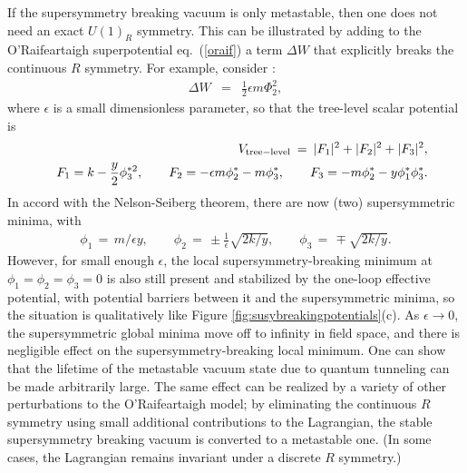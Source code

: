 \documentclass[11pt]{article}
\def\beq{\begin{eqnarray}}
\def\eeq{\end{eqnarray}}
\begin{document}
If the supersymmetry breaking vacuum is only metastable, then one does not need an exact $U(1)_R$ 
symmetry. This can be illustrated by adding to the O'Rai\-f\-ear\-taigh superpotential 
eq.~(\ref{oraif}) a term $\Delta W$ that explicitly breaks the continuous $R$ symmetry. For example, consider 
\cite{Intriligator:2007py}:
\beq
\Delta W &=& \frac{1}{2} \epsilon m \Phi_2^2,
\eeq
where $\epsilon$ is a small dimensionless parameter, so that the tree-level scalar potential is
\beq
&&
V_{\rm tree-level} \>=\> |F_1|^2 + |F_2|^2 + |F_3|^2,
\\
&& F_1 = k - {y\over 2} \phi_3^{*2} ,\qquad
F_2 = -\epsilon m \phi_2^* -m \phi^*_3 ,\qquad
F_3 = -m \phi^*_2 - y \phi^*_1 \phi^*_3 .
\eeq  
In accord with the Nelson-Seiberg theorem,
there are now (two) supersymmetric minima, with
\beq
\phi_1 \,=\, m/\epsilon y,
\qquad
\phi_2 \,=\, \pm \frac{1}{\epsilon} \sqrt{2k/y},
\qquad
\phi_3 \,=\, \mp \sqrt{2k/y}.
\eeq
However, for small enough $\epsilon$, the local supersymmetry-breaking minimum at 
$\phi_1=\phi_2=\phi_3=0$
is also still present and stabilized by 
the one-loop effective potential, with potential barriers 
between it and the supersymmetric minima, so the situation is qualitatively like
Figure \ref{fig:susybreakingpotentials}(c).
As $\epsilon \rightarrow 0$, the supersymmetric global minima 
move off to infinity in field space,
and there is negligible effect on the supersymmetry-breaking local minimum.
One can show \cite{Intriligator:2007py} that the lifetime of the metastable vacuum state 
due to quantum tunneling can be made 
arbitrarily large. The same effect can be realized by a variety of other 
perturbations to the O'Rai\-f\-ear\-taigh model; by eliminating the continuous
$R$ symmetry using small additional contributions to the Lagrangian, 
the stable supersymmetry breaking vacuum is converted to a metastable one. 
(In some cases, the Lagrangian remains invariant under a discrete $R$ symmetry.)
\end{document}
